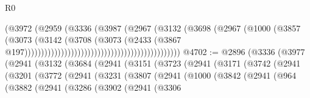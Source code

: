 \begin{lexlean}{R0}
\begin{coremodule}
                                                                  (@3972
                                                                    (@2959
                                                                      (@3336
                                                                        (@3987
                                                                          (@2967
                                                                            (@3132
                                                                              (@3698
                                                                                (@2967
                                                                                  (@1000
                                                                                    (@3857
                                                                                      (@3073
                                                                                        (@3142
                                                                                          (@3708
                                                                                            (@3073
                                                                                              (@2433
                                                                                                (@3867
                                                                                                  @197)))))))))))))))))))))))))))))))))))))))))))))))
@4702 := @2896
    (@3336
      (@3977
        (@2941
          (@3132
            (@3684
              (@2941
                (@3151
                  (@3723
                    (@2941
                      (@3171
                        (@3742
                          (@2941
                            (@3201
                              (@3772
                                (@2941
                                  (@3231
                                    (@3807
                                      (@2941
                                        (@1000
                                          (@3842
                                            (@2941
                                              (@964
                                                (@3882
                                                  (@2941
                                                    (@3286
                                                      (@3902
                                                        (@2941
                                                          (@3306

\end{coremodule}
\end{lexlean}
